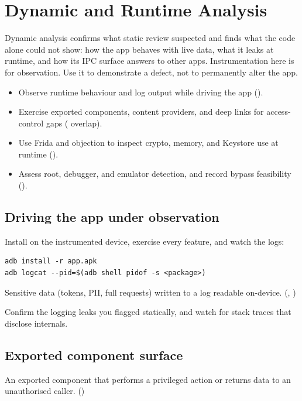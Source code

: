 \chapter{Dynamic and Runtime Analysis}\label{ch:dynamic}

Dynamic analysis confirms what static review suspected and finds what the code alone could not show: how the app behaves with live data, what it leaks at runtime, and how its IPC surface answers to other apps. Instrumentation here is for observation. Use it to demonstrate a defect, not to permanently alter the app.

\begin{objectives}
\begin{itemize}[leftmargin=12pt]
\item Observe runtime behaviour and log output while driving the app ().
\item Exercise exported components, content providers, and deep links for access-control gaps ( overlap).
\item Use Frida and objection to inspect crypto, memory, and Keystore use at runtime ().
\item Assess root, debugger, and emulator detection, and record bypass feasibility ().
\end{itemize}
\end{objectives}

\section{Driving the app under observation}
Install on the instrumented device, exercise every feature, and watch the logs:

\begin{lstlisting}
adb install -r app.apk
adb logcat --pid=$(adb shell pidof -s <package>)
\end{lstlisting}

\begin{findingbox}
Sensitive data (tokens, PII, full requests) written to a log readable on-device. (, )
\end{findingbox}
Confirm the logging leaks you flagged statically, and watch for stack traces that disclose internals.

\section{Exported component surface}
\begin{findingbox}
An exported component that performs a privileged action or returns data to an unauthorised caller. ()
\end{findingbox}

